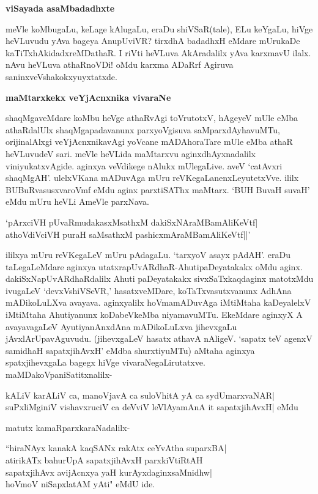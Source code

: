 \textbf{viSayada asaMbadadhxte}

meVle koMbugaLu, keLage kAlugaLu, eraDu shiVSaR(tale), ELu keYgaLu, hiVge heVLuvudu yAva bageya AnupUviVR? tirxdhA badadhxH eMdare mUrukaDe kaTiTxhAkidadxreMDathaR. I riVti heVLuva AkAradalilx yAva karxmavU ilalx. nAvu heVLuva athaRnoVDi! oMdu karxma ADaRrf Agiruva saninxveVshakokxyuyxtatxde.

\textbf{maMtarxkekx veYjAcnxnika vivaraNe}

shaqMgaveMdare koMbu heVge athaRvAgi toVrutotxV, hAgeyeV mUle eMba athaRdalUlx shaqMgapadavanunx parxyoVgisuva saMparxdAyhavuMTu, orijinalAlxgi veYjAcnxnikavAgi yoVcane mADAhoraTare mUle eMba athaR heVLuvudeV sari. meVle heVLida maMtarxvu aginxdhAyxnadalilx viniyukatxvAgide. aginxya veVdikege nAlukx mUlegaLive. aveV `catAvxri shaqMgAH'. ulelxVKana mADuvAga mUru reVKegaLanenxLeyutetxVve. ililx BUBuRvasusxvaroVmf eMdu aginx parxtiSAThx maMtarx. `BUH BuvaH suvaH' eMdu mUru heVLi AmeVle parxNava.

\begin{shloka}
`pArxciVH pUvaRmudakasxMsathxM dakiSxNAraMBamAliKeVtf|\\
athoVdiVciVH puraH saMsathxM pashicxmAraMBamAliKeVtf||'
\end{shloka}

ililxya mUru reVKegaLeV mUru pAdagaLu. `tarxyoV asayx pAdAH'. eraDu 
taLegaLeMdare aginxya utatxrapUvARdhaR-AhutipaDeyatakakx oMdu aginx. dakiSxNapUvARdhaRdalilx Ahuti paDeyatakakx sivxSaTxkaqdaginx matotxMdu ivugaLeV `devxVshiVSeVR,' hasatxveMDare, koTaTxvasutxvanunx AdhAna mADikoLuLXva avayava. aginxyalilx hoVmamADuvAga iMtiMtaha kaDeyalelxV iMtiMtaha Ahutiyanunx koDabeVkeMba niyamavuMTu. EkeMdare aginxyX A avayavagaLeV AyutiyanAnxdAna mADikoLuLxva jihevxgaLu jAvxlArUpavAguvudu. (jihevxgaLeV hasatx athavA nAligeV. `sapatx teV agenxV samidhaH sapatxjihAvxH' eMdba shurxtiyuMTu) aMtaha aginxya spatxjihevxgaLa bagegx hiVge vivaraNegaLirutatxve. maMDakoVpaniSatitxnalilx-

\begin{shloka}
kALiV karALiV ca, manoVjavA ca suloVhitA yA ca sydUmarxvaNAR|\\
suPxliMginiV vishavxruciV ca deVviV leVlAyamAnA it sapatxjihAvxH| eMdu\\
\end{shloka}

matutx kamaRparxkaraNadalilx-

\begin{shloka}
``hiraNAyx kanakA kaqSANx rakAtx ceYvAtha suparxBA|\\
atirikATx bahurUpA sapatxjihAvxH parxkiVtiRtAH\\
sapatxjihAvx avijAcnxya yaH kurAyxdaginxsaMnidhw|\\
hoVmoV niSapxlatAM yAti" eMdU ide.
\end{shloka}

